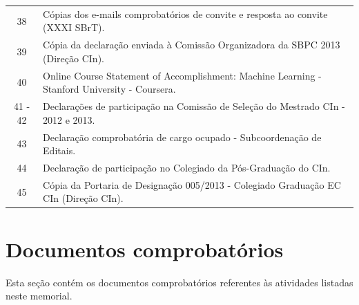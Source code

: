 \documentclass[a4paper,oneside,10pt]{article}
\newcounter{document}%
\begin{document}
\begin{table}[h]
\begin{tabular}{cl}
  38 & C\'{o}pias dos e-mails comprobat\'{o}rios de convite e resposta ao convite (XXXI SBrT). \\
  39 & C\'{o}pia da declara\c{c}\~{a}o enviada \`{a} Comiss\~{a}o Organizadora da SBPC 2013 (Dire\c{c}\~{a}o CIn). \\
  40 & Online Course Statement of Accomplishment: Machine Learning - Stanford University - Coursera. \\
  41 - 42 & Declara\c{c}\~{o}es de participa\c{c}\~{a}o na Comiss\~{a}o de Sele\c{c}\~{a}o do Mestrado CIn - 2012 e 2013. \\
  43 & Declara\c{c}\~{a}o comprobat\'{o}ria de cargo ocupado - Subcoordena\c{c}\~{a}o de Editais. \\
  44 & Declara\c{c}\~{a}o de participa\c{c}\~{a}o no Colegiado da P\'{o}s-Gradua\c{c}\~{a}o do CIn. \\
  45 & C\'{o}pia da Portaria de Designa\c{c}\~{a}o 005/2013 - Colegiado Gradua\c{c}\~{a}o EC CIn (Dire\c{c}\~{a}o CIn). \\
\bottomrule
\end{tabular}
\label{Tab:ListaAnexos}
\end{table}

\clearpage
\appendix
\newpage
\section{Documentos comprobatórios}
Esta seção contém os documentos comprobatórios referentes às atividades listadas neste memorial.
\renewcommand{\thesubsection}{\arabic{subsection}}


\end{document}
